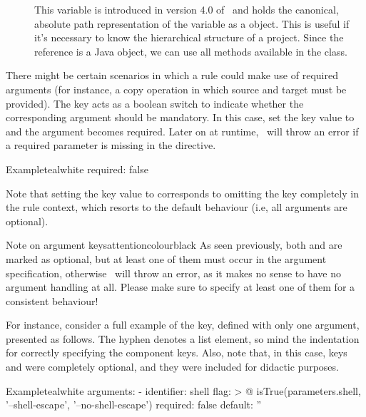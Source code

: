 \begin{description}
\begin{description}
\begin{description}
\item[] This variable is introduced in version 4.0 of \arara\ and holds the canonical, absolute path representation of the  variable as a  object. This is useful if it's necessary to know the hierarchical structure of a project. Since the reference is a Java object, we can use all methods available in the  class.
\end{description}

\item[\describecontext{O}{arguments}{required}] There might be certain scenarios in which a rule could make use of required arguments (for instance, a copy operation in which source and target must be provided). The  key acts as a boolean switch to indicate whether the corresponding argument should be mandatory. In this case, set the key value to  and the argument becomes required. Later on at runtime, \arara\ will throw an error if a required parameter is missing in the directive.

\begin{codebox}{Example}{teal}{\icnote}{white}
required: false
\end{codebox}

Note that setting the  key value to  corresponds to omitting the key completely in the rule context, which resorts to the default behaviour (i.e, all arguments are optional).
\end{description}

\begin{messagebox}{Note on argument keys}{attentioncolour}{\icattention}{black}
As seen previously, both  and  are marked as optional, but at least one of them must occur in the argument specification, otherwise \arara\ will throw an error, as it makes no sense to have no argument handling at all. Please make sure to specify at least one of them for a consistent behaviour!
\end{messagebox}

For instance, consider a full example of the  key, defined with only one argument, presented as follows. The hyphen denotes a list element, so mind the indentation for correctly specifying the component keys. Also, note that, in this case, keys  and  were completely optional, and they were included for didactic purposes.

\begin{codebox}{Example}{teal}{\icnote}{white}
arguments:
- identifier: shell
  flag: >
    @{
        isTrue(parameters.shell,
               '--shell-escape',
               '--no-shell-escape')
    }
  required: false
  default: ''
\end{codebox}
\end{description}

